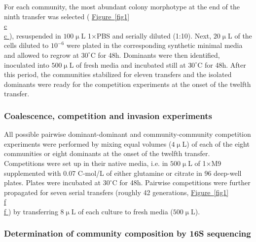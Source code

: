 \documentclass[a4paper,10pt]{article}
\newcommand{\figref}[2][]{%
  \hyperref[{#2}]{%
    Figure~\ref*{#2}%
    \ifx\\#1\\%
    \else
      #1%
    \fi
  }%
}
\begin{document}
For each community, the most abundant colony morphotype at the end of the ninth transfer
was selected (\figref[c]{fig1}),
resuspended in $100\upmu$L 1$\times$PBS and serially diluted (1:10).
Next, $20\upmu$L of the cells diluted to $10^{-6}$ were plated in the corresponding synthetic
minimal media and allowed to regrow at $30^\circ$C for 48h. Dominants were then identified,
inoculated into $500\upmu$L of fresh media and incubated still at $30^\circ$C for 48h.
After this period, the communities stabilized for eleven transfers and the isolated dominants
were ready for the competition experiments at the onset of the twelfth transfer.

\subsubsection*{Coalescence, competition and invasion experiments}
\label{methods:competitions}

All possible pairwise dominant-dominant and community-community
competition experiments
were performed by mixing equal volumes ($4\upmu$L) of each of the eight
communities or eight dominants at the onset of the twelfth transfer.
Competitions were set up in their native media,
i.e. in $500\upmu$L of 1$\times$M9 supplemented with 0.07 C-mol/L of
either glutamine or citrate in 96 deep-well plates.
Plates were incubated at $30^\circ$C for 48h.
Pairwise competitions were further propagated for seven serial transfers
(roughly 42 generations, \figref[f]{fig1}) by transferring $8\upmu$L of
each culture to fresh media ($500\upmu$L).

\subsubsection*{Determination of community composition by 16S sequencing}
\label{methods:sequencing}
\end{document}
